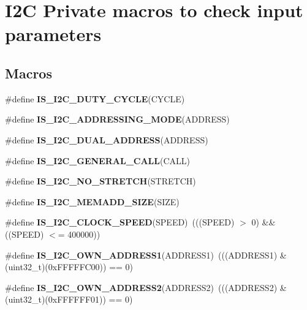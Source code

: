 \hypertarget{group___i2_c___i_s___r_t_c___definitions}{}\section{I2C Private macros to check input parameters}
\label{group___i2_c___i_s___r_t_c___definitions}
\subsection*{Macros}
\begin{DoxyCompactItemize}
\item 
\#define {\bfseries I\+S\+\_\+\+I2\+C\+\_\+\+D\+U\+T\+Y\+\_\+\+C\+Y\+C\+LE}(C\+Y\+C\+LE)
\item 
\#define {\bfseries I\+S\+\_\+\+I2\+C\+\_\+\+A\+D\+D\+R\+E\+S\+S\+I\+N\+G\+\_\+\+M\+O\+DE}(A\+D\+D\+R\+E\+SS)
\item 
\#define {\bfseries I\+S\+\_\+\+I2\+C\+\_\+\+D\+U\+A\+L\+\_\+\+A\+D\+D\+R\+E\+SS}(A\+D\+D\+R\+E\+SS)
\item 
\#define {\bfseries I\+S\+\_\+\+I2\+C\+\_\+\+G\+E\+N\+E\+R\+A\+L\+\_\+\+C\+A\+LL}(C\+A\+LL)
\item 
\#define {\bfseries I\+S\+\_\+\+I2\+C\+\_\+\+N\+O\+\_\+\+S\+T\+R\+E\+T\+CH}(S\+T\+R\+E\+T\+CH)
\item 
\#define {\bfseries I\+S\+\_\+\+I2\+C\+\_\+\+M\+E\+M\+A\+D\+D\+\_\+\+S\+I\+ZE}(S\+I\+ZE)
\item 
\#define {\bfseries I\+S\+\_\+\+I2\+C\+\_\+\+C\+L\+O\+C\+K\+\_\+\+S\+P\+E\+ED}(S\+P\+E\+ED)~(((S\+P\+E\+ED) $>$ 0) \&\& ((S\+P\+E\+ED) $<$= 400000))\hypertarget{group___i2_c___i_s___r_t_c___definitions_gae0d731df1b264d853703716c29309b9b}{}\label{group___i2_c___i_s___r_t_c___definitions_gae0d731df1b264d853703716c29309b9b}

\item 
\#define {\bfseries I\+S\+\_\+\+I2\+C\+\_\+\+O\+W\+N\+\_\+\+A\+D\+D\+R\+E\+S\+S1}(A\+D\+D\+R\+E\+S\+S1)~(((A\+D\+D\+R\+E\+S\+S1) \& (uint32\+\_\+t)(0x\+F\+F\+F\+F\+F\+C00)) == 0)\hypertarget{group___i2_c___i_s___r_t_c___definitions_gad84e8b9523d45b6105b4d5cb68994a79}{}\label{group___i2_c___i_s___r_t_c___definitions_gad84e8b9523d45b6105b4d5cb68994a79}

\item 
\#define {\bfseries I\+S\+\_\+\+I2\+C\+\_\+\+O\+W\+N\+\_\+\+A\+D\+D\+R\+E\+S\+S2}(A\+D\+D\+R\+E\+S\+S2)~(((A\+D\+D\+R\+E\+S\+S2) \& (uint32\+\_\+t)(0x\+F\+F\+F\+F\+F\+F01)) == 0)\hypertarget{group___i2_c___i_s___r_t_c___definitions_ga83001d53612b83ee90730d3bb2732537}{}\label{group___i2_c___i_s___r_t_c___definitions_ga83001d53612b83ee90730d3bb2732537}

\end{DoxyCompactItemize}


